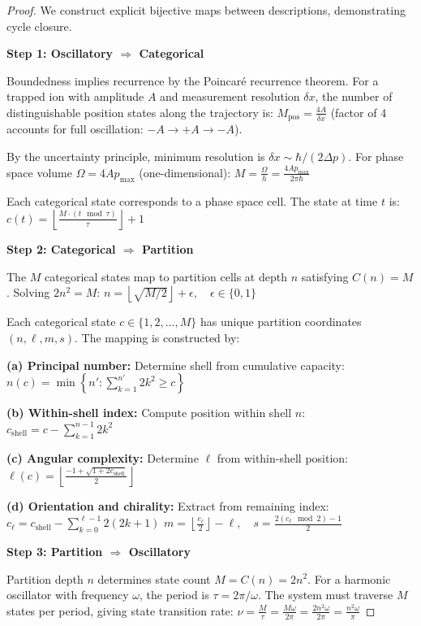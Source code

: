 \begin{proof}
We construct explicit bijective maps between descriptions, demonstrating cycle closure.

\textbf{Step 1: Oscillatory $\Rightarrow$ Categorical}

Boundedness implies recurrence by the Poincaré recurrence theorem. For a trapped ion with amplitude $A$ and measurement resolution $\delta x$, the number of distinguishable position states along the trajectory is:
$
M_{\mathrm{pos}} = \frac{4A}{\delta x}
$
(factor of 4 accounts for full oscillation: $-A \to +A \to -A$).

By the uncertainty principle, minimum resolution is $\delta x \sim \hbar/(2\Delta p)$. For phase space volume $\Omega = 4Ap_{\max}$ (one-dimensional):
$
M = \frac{\Omega}{h} = \frac{4Ap_{\max}}{2\pi\hbar}
$

Each categorical state corresponds to a phase space cell. The state at time $t$ is:
$
c(t) = \left\lfloor \frac{M \cdot (t \mod \tau)}{\tau} \right\rfloor + 1
$

\textbf{Step 2: Categorical $\Rightarrow$ Partition}

The $M$ categorical states map to partition cells at depth $n$ satisfying $C(n) = M$. Solving $2n^2 = M$:
$
n = \left\lfloor \sqrt{M/2} \right\rfloor + \epsilon, \quad \epsilon \in \{0, 1\}
$

Each categorical state $c \in \{1, 2, \ldots, M\}$ has unique partition coordinates $(n, \ell, m, s)$. The mapping is constructed by:

\textbf{(a) Principal number:} Determine shell from cumulative capacity:
$
n(c) = \min\left\{n' : \sum_{k=1}^{n'} 2k^2 \geq c\right\}
$

\textbf{(b) Within-shell index:} Compute position within shell $n$:
$
c_{\mathrm{shell}} = c - \sum_{k=1}^{n-1} 2k^2
$

\textbf{(c) Angular complexity:} Determine $\ell$ from within-shell position:
$
\ell(c) = \left\lfloor \frac{-1 + \sqrt{1 + 2c_{\mathrm{shell}}}}{2} \right\rfloor
$

\textbf{(d) Orientation and chirality:} Extract from remaining index:
$
c_{\ell} = c_{\mathrm{shell}} - \sum_{k=0}^{\ell-1} 2(2k+1)
$
$
m = \left\lfloor \frac{c_{\ell}}{2} \right\rfloor - \ell, \quad s = \frac{2(c_{\ell} \mod 2) - 1}{2}
$

\textbf{Step 3: Partition $\Rightarrow$ Oscillatory}

Partition depth $n$ determines state count $M = C(n) = 2n^2$. For a harmonic oscillator with frequency $\omega$, the period is $\tau = 2\pi/\omega$. The system must traverse $M$ states per period, giving state transition rate:
$
\nu = \frac{M}{\tau} = \frac{M\omega}{2\pi} = \frac{2n^2\omega}{2\pi} = \frac{n^2\omega}{\pi}
$


\end{proof}
